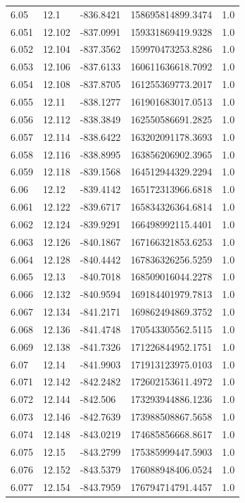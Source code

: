 \begin{tabular}{lllll}
6.05 & 12.1 & -836.8421 & 158695814899.3474 & 1.0 \\
6.051 & 12.102 & -837.0991 & 159331869419.9328 & 1.0 \\
6.052 & 12.104 & -837.3562 & 159970473253.8286 & 1.0 \\
6.053 & 12.106 & -837.6133 & 160611636618.7092 & 1.0 \\
6.054 & 12.108 & -837.8705 & 161255369773.2017 & 1.0 \\
6.055 & 12.11 & -838.1277 & 161901683017.0513 & 1.0 \\
6.056 & 12.112 & -838.3849 & 162550586691.2825 & 1.0 \\
6.057 & 12.114 & -838.6422 & 163202091178.3693 & 1.0 \\
6.058 & 12.116 & -838.8995 & 163856206902.3965 & 1.0 \\
6.059 & 12.118 & -839.1568 & 164512944329.2294 & 1.0 \\
6.06 & 12.12 & -839.4142 & 165172313966.6818 & 1.0 \\
6.061 & 12.122 & -839.6717 & 165834326364.6814 & 1.0 \\
6.062 & 12.124 & -839.9291 & 166498992115.4401 & 1.0 \\
6.063 & 12.126 & -840.1867 & 167166321853.6253 & 1.0 \\
6.064 & 12.128 & -840.4442 & 167836326256.5259 & 1.0 \\
6.065 & 12.13 & -840.7018 & 168509016044.2278 & 1.0 \\
6.066 & 12.132 & -840.9594 & 169184401979.7813 & 1.0 \\
6.067 & 12.134 & -841.2171 & 169862494869.3752 & 1.0 \\
6.068 & 12.136 & -841.4748 & 170543305562.5115 & 1.0 \\
6.069 & 12.138 & -841.7326 & 171226844952.1751 & 1.0 \\
6.07 & 12.14 & -841.9903 & 171913123975.0103 & 1.0 \\
6.071 & 12.142 & -842.2482 & 172602153611.4972 & 1.0 \\
6.072 & 12.144 & -842.506 & 173293944886.1236 & 1.0 \\
6.073 & 12.146 & -842.7639 & 173988508867.5658 & 1.0 \\
6.074 & 12.148 & -843.0219 & 174685856668.8617 & 1.0 \\
6.075 & 12.15 & -843.2799 & 175385999447.5903 & 1.0 \\
6.076 & 12.152 & -843.5379 & 176088948406.0524 & 1.0 \\
6.077 & 12.154 & -843.7959 & 176794714791.4457 & 1.0 \\

\end{tabular}
